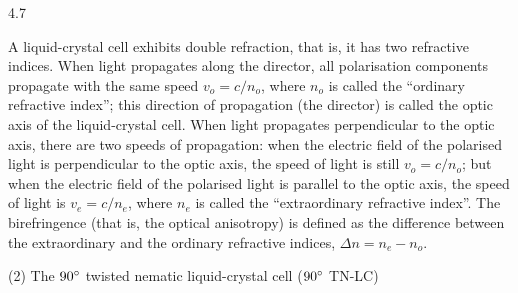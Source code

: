 \begin{figbox}{4.7}
\end{figbox}

A liquid-crystal cell exhibits double refraction, that is, it has two refractive indices. When light propagates along the director, all polarisation components propagate with the same speed $v_o=c/n_o$, where $n_o$ is called the ``ordinary refractive index''; this direction of propagation (the director) is called the optic axis of the liquid-crystal cell. When light propagates perpendicular to the optic axis, there are two speeds of propagation: when the electric field of the polarised light is perpendicular to the optic axis, the speed of light is still $v_o=c/n_o$; but when the electric field of the polarised light is parallel to the optic axis, the speed of light is $v_e=c/n_e$, where $n_e$ is called the ``extraordinary refractive index''. The birefringence (that is, the optical anisotropy) is defined as the difference between the extraordinary and the ordinary refractive indices, $\Delta n=n_e-n_o$.

(2) The $90^{\circ}$ twisted nematic liquid-crystal cell ($90^{\circ}$ TN-LC)

